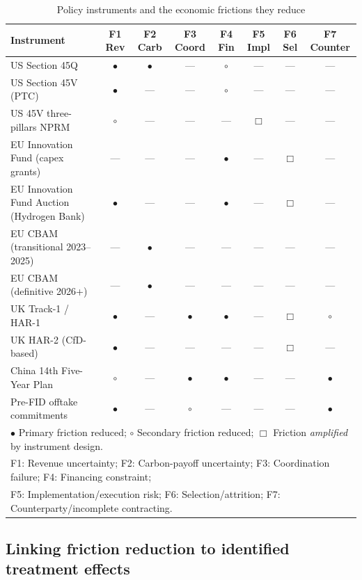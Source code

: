 \begin{table}[!htbp]
\centering
\caption{Policy instruments and the economic frictions they reduce}
\label{tab:ch3-friction-instrument}
\small
\begin{tabular}{lccccccc}
\toprule
Instrument & F1 Rev & F2 Carb & F3 Coord & F4 Fin & F5 Impl & F6 Sel & F7 Counter \\
\midrule
US Section 45Q & $\bullet$ & $\bullet$ & --- & $\circ$ & --- & --- & --- \\
US Section 45V (PTC) & $\bullet$ & --- & --- & $\circ$ & --- & --- & --- \\
US 45V three-pillars NPRM & $\circ$ & --- & --- & --- & $\Box$ & --- & --- \\
EU Innovation Fund (capex grants) & --- & --- & --- & $\bullet$ & --- & $\Box$ & --- \\
EU Innovation Fund Auction (Hydrogen Bank) & $\bullet$ & --- & --- & $\bullet$ & --- & $\Box$ & --- \\
EU CBAM (transitional 2023--2025) & --- & $\bullet$ & --- & --- & --- & --- & --- \\
EU CBAM (definitive 2026+) & --- & $\bullet$ & --- & --- & --- & --- & --- \\
UK Track-1 / HAR-1 & $\bullet$ & --- & $\bullet$ & $\bullet$ & --- & $\Box$ & $\circ$ \\
UK HAR-2 (CfD-based) & $\bullet$ & --- & --- & --- & --- & $\Box$ & --- \\
China 14th Five-Year Plan & $\circ$ & --- & $\bullet$ & $\bullet$ & --- & --- & $\bullet$ \\
Pre-FID offtake commitments & $\bullet$ & --- & $\circ$ & --- & --- & --- & $\bullet$ \\
\bottomrule
\multicolumn{8}{l}{\footnotesize $\bullet$ Primary friction reduced; $\circ$ Secondary friction reduced; $\Box$ Friction \emph{amplified} by instrument design.} \\
\multicolumn{8}{l}{\footnotesize F1: Revenue uncertainty; F2: Carbon-payoff uncertainty; F3: Coordination failure; F4: Financing constraint;} \\
\multicolumn{8}{l}{\footnotesize F5: Implementation/execution risk; F6: Selection/attrition; F7: Counterparty/incomplete contracting.} \\
\end{tabular}
\end{table}

\subsection{Linking friction reduction to identified treatment effects}
\label{sec:ch3-friction-effects}

